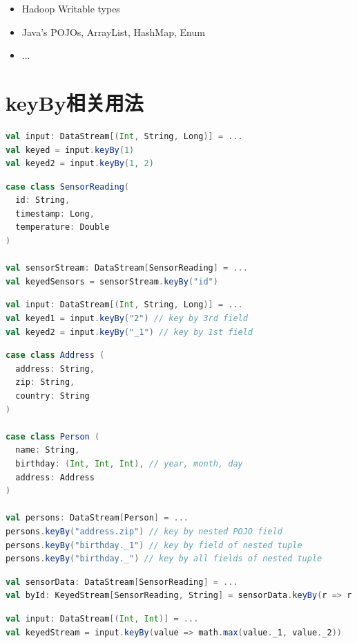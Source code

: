\documentclass[oneside]{ctexbook}
\begin{document}
\begin{itemize}
\item Hadoop Writable types
\item Java's POJOs, ArrayList, HashMap, Enum
\item ...
\end{itemize}

\section{keyBy相关用法}

\begin{lstlisting}[language=scala]
val input: DataStream[(Int, String, Long)] = ...
val keyed = input.keyBy(1)
val keyed2 = input.keyBy(1, 2)
\end{lstlisting}

\begin{lstlisting}[language=scala]
case class SensorReading(
  id: String,
  timestamp: Long,
  temperature: Double
)

val sensorStream: DataStream[SensorReading] = ...
val keyedSensors = sensorStream.keyBy("id")
\end{lstlisting}

\begin{lstlisting}[language=scala]
val input: DataStream[(Int, String, Long)] = ...
val keyed1 = input.keyBy("2") // key by 3rd field
val keyed2 = input.keyBy("_1") // key by 1st field
\end{lstlisting}

\begin{lstlisting}[language=scala]
case class Address (
  address: String,
  zip: String,
  country: String
)

case class Person (
  name: String,
  birthday: (Int, Int, Int), // year, month, day
  address: Address
)

val persons: DataStream[Person] = ...
persons.keyBy("address.zip") // key by nested POJO field
persons.keyBy("birthday._1") // key by field of nested tuple
persons.keyBy("birthday._") // key by all fields of nested tuple
\end{lstlisting}

\begin{lstlisting}[language=scala, breaklines]
val sensorData: DataStream[SensorReading] = ...
val byId: KeyedStream[SensorReading, String] = sensorData.keyBy(r => r.id)
\end{lstlisting}

\begin{lstlisting}[language=scala, breaklines]
val input: DataStream[(Int, Int)] = ...
val keyedStream = input.keyBy(value => math.max(value._1, value._2))
\end{lstlisting}
\end{document}
